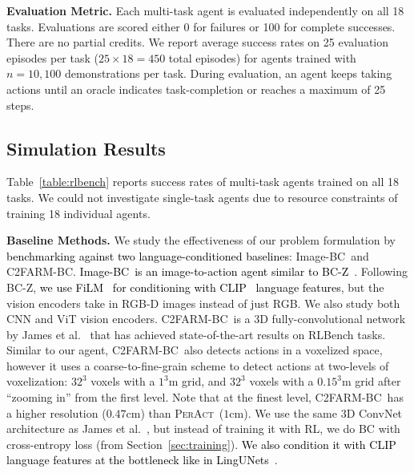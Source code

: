 \documentclass{article}
\newcommand{\secref}[1]{Section~\ref{#1}}
\newcommand{\tabref}[1]{Table~\ref{#1}}
\newcommand{\bcz}{Image-BC~}
\newcommand{\unet}{C2FARM-BC~}
\newcommand{\highlight}[1]{\textcolor{black}{#1}}
\newcommand{\model}{\textsc{PerAct}}
\begin{document}
\textbf{Evaluation Metric.} Each multi-task agent is evaluated independently on all 18 tasks. Evaluations are scored either 0 for failures or 100 for complete successes. There are no partial credits. We report average success rates on 25 evaluation episodes per task ($25 \times18 = 450$ total episodes) for agents trained with $n=10,100$ demonstrations per task. During evaluation, an agent keeps taking actions until an oracle indicates task-completion or reaches a maximum of 25 steps.

\vspace{-0.2cm}
\subsection{Simulation Results}
\label{sec:sim_results}
\vspace{-0.1cm}


\tabref{table:rlbench} reports success rates of multi-task agents trained on all 18 tasks. 
We could not investigate single-task agents due to resource constraints of training 18 individual agents. 

\textbf{Baseline Methods.} We study the effectiveness of our problem formulation by \highlight{benchmarking against two language-conditioned baselines}: \bcz and C2FARM-BC.
\highlight{\bcz is an image-to-action agent similar to BC-Z~\citep{jang2022bc}}. Following BC-Z, \highlight{we use FiLM~\citep{perez2018film} for conditioning with   CLIP~\citep{radfordLearningTransferableVisual2021} language features}, but the vision encoders take in RGB-D images instead of just RGB. We also  study both CNN and ViT vision encoders. \unet is a 3D fully-convolutional network by James et al.~\citep{c2farm} that has achieved state-of-the-art results on RLBench tasks. Similar to our agent, \unet also detects actions in a voxelized space, however it uses a coarse-to-fine-grain scheme to detect actions at two-levels of voxelization: $32^3$ voxels with a $1^3$m grid, and $32^3$ voxels with a $0.15^3$m grid after ``zooming in'' from the first level. Note that at the finest level, \unet has a higher resolution ($0.47$cm) than \model~($1$cm). We use the same 3D ConvNet architecture as James et al.~\citep{c2farm}, but instead of training it with RL, we do BC with cross-entropy loss (from \secref{sec:training}). \highlight{We also condition it with CLIP~\citep{radfordLearningTransferableVisual2021} language features at the bottleneck like in LingUNets~\citep{misra2018mapping,cliport}}. 
\end{document}
